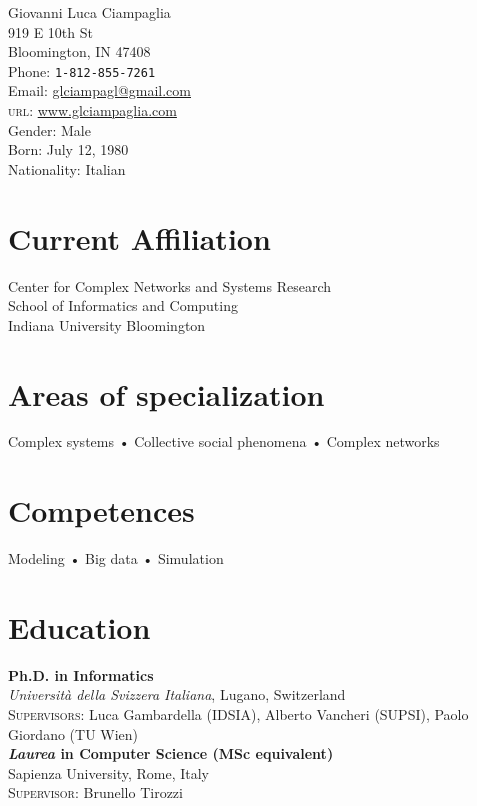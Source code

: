 \documentclass[10pt, letterpaper]{article}
\newcommand{\years}[1]{\marginnote{\small #1}}
\begin{document}
{\LARGE Giovanni Luca Ciampaglia}\\[1cm]
919 E 10th St \\
Bloomington, IN 47408\\[.2cm]
Phone: \texttt{1-812-855-7261}\\
Email: \href{mailto:gciampag@indiana.edu}{glciampagl@gmail.com}\\
\textsc{url}: \href{http://www.glciampaglia.com/}{www.glciampaglia.com}\\[.2cm]
Gender: Male\\
Born:  July 12, 1980\\
Nationality: Italian

\section*{Current Affiliation}

Center for Complex Networks and Systems Research\\
School of Informatics and Computing\\
Indiana University Bloomington

\section*{Areas of specialization}
Complex systems • Collective social phenomena • Complex networks

\section*{Competences}
Modeling • Big data • Simulation

\section*{Education}
\noindent

\years{2012}\textbf{Ph.D. in Informatics}\\
%
\textsl{Università della Svizzera Italiana}, Lugano, Switzerland\\
%
\textsc{Supervisors}: Luca Gambardella (IDSIA), Alberto Vancheri (SUPSI), Paolo
Giordano (TU Wien)\\[1em]

\years{2006}\textbf{\textsl{Laurea} in Computer Science (MSc equivalent)}\\ 
%
Sapienza University, Rome, Italy\\
%
\textsc{Supervisor}: Brunello Tirozzi \\[1em]
\end{document}
